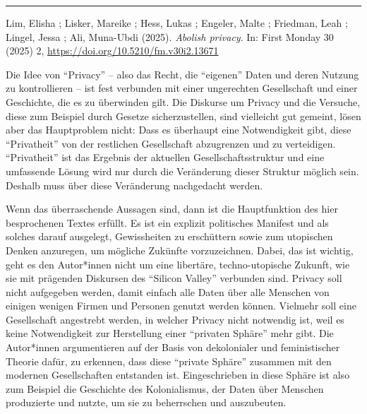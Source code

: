 \documentclass[a4paper,
fontsize=11pt,
oneside,
numbers=noperiodatend,
parskip=half-,
bibliography=totoc,
final
]{scrartcl}
\begin{document}
\begin{center}\rule{0.5\linewidth}{0.5pt}\end{center}

Lim, Elisha ; Lisker, Mareike ; Hess, Lukas ; Engeler, Malte ; Friedman,
Leah ; Lingel, Jessa ; Ali, Muna-Ubdi (2025). \emph{Abolish privacy}.
In: First Monday 30 (2025) 2,
\url{https://doi.org/10.5210/fm.v30i2.13671}

Die Idee von \enquote{Privacy} -- also das Recht, die \enquote{eigenen}
Daten und deren Nutzung zu kontrollieren -- ist fest verbunden mit einer
ungerechten Gesellschaft und einer Geschichte, die es zu überwinden
gilt. Die Diskurse um Privacy und die Versuche, diese zum Beispiel durch
Gesetze sicherzustellen, sind vielleicht gut gemeint, lösen aber das
Hauptproblem nicht: Dass es überhaupt eine Notwendigkeit gibt, diese
\enquote{Privatheit} von der restlichen Gesellschaft abzugrenzen und zu
verteidigen. \enquote{Privatheit} ist das Ergebnis der aktuellen
Gesellschaftsstruktur und eine umfassende Lösung wird nur durch die
Veränderung dieser Struktur möglich sein. Deshalb muss über diese
Veränderung nachgedacht werden.

Wenn das überraschende Aussagen sind, dann ist die Hauptfunktion des
hier besprochenen Textes erfüllt. Es ist ein explizit politisches
Manifest und als solches darauf ausgelegt, Gewissheiten zu erschüttern
sowie zum utopischen Denken anzuregen, um mögliche Zukünfte
vorzuzeichnen. Dabei, das ist wichtig, geht es den Autor*innen nicht um
eine libertäre, techno-utopische Zukunft, wie sie mit prägenden
Diskursen des \enquote{Silicon Valley} verbunden sind. Privacy soll
nicht aufgegeben werden, damit einfach alle Daten über alle Menschen von
einigen wenigen Firmen und Personen genutzt werden können. Vielmehr soll
eine Gesellschaft angestrebt werden, in welcher Privacy nicht notwendig
ist, weil es keine Notwendigkeit zur Herstellung einer \enquote{privaten
Sphäre} mehr gibt. Die Autor*innen argumentieren auf der Basis von
dekolonialer und feministischer Theorie dafür, zu erkennen, dass diese
\enquote{private Sphäre} zusammen mit den modernen Gesellschaften
entstanden ist. Eingeschrieben in diese Sphäre ist also zum Beispiel die
Geschichte des Kolonialismus, der Daten über Menschen produzierte und
nutzte, um sie zu beherrschen und auszubeuten.
\end{document}
